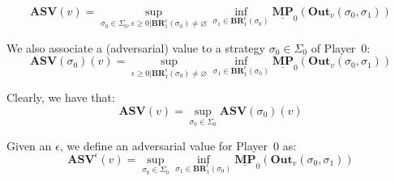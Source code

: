 


\begin{equation*}
    \mathbf{ASV}(v) = \sup\limits_{\sigma_0 \in \Sigma_0, \epsilon \geqslant 0| \mathbf{BR}^{\epsilon}_1(\sigma_0) \neq \varnothing}  \inf \limits_{\sigma_1 \in \mathbf{BR}^{\epsilon}_1(\sigma_0)} \underline{\mathbf{MP}}_0(\mathbf{Out}_v(\sigma_0,\sigma_1))
\end{equation*}

We also associate a (adversarial) value to a strategy $\sigma_0 \in \Sigma_0$ of Player~0: 
\begin{equation*}
    \mathbf{ASV}(\sigma_0)(v) = \sup\limits_{\epsilon \geqslant 0| \mathbf{BR}^{\epsilon}_1(\sigma_0) \neq \varnothing}  \inf \limits_{\sigma_1 \in \mathbf{BR}^{\epsilon}_1(\sigma_0)} \underline{\mathbf{MP}}_0(\mathbf{Out}_v(\sigma_0,\sigma_1))
\end{equation*}

Clearly, we have that:
\begin{equation*}
    \mathbf{ASV}(v) = \sup\limits_{\sigma_0 \in \Sigma_0} \mathbf{ASV}(\sigma_0)(v)
\end{equation*}

Given an $\epsilon$, we define an adversarial value for Player~0 as:
\begin{equation*}
    \mathbf{ASV}^{\epsilon}(v) = \sup\limits_{\sigma_0 \in \Sigma_0}  \inf \limits_{\sigma_1 \in \mathbf{BR}^{\epsilon}_1(\sigma_0)} \underline{\mathbf{MP}}_0(\mathbf{Out}_v(\sigma_0,\sigma_1))
\end{equation*}

